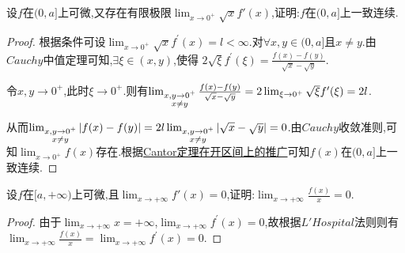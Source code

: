 \documentclass[lang=cn,newtx,10pt,scheme=chinese]{../Template/elegantbook}
\begin{document}
\begin{exercise}
    设\(f\)在\((0,a]\)上可微,又存在有限极限\(\lim_{x \to 0^+} \sqrt{x}f'(x)\),证明:\(f\)在\((0,a]\)上一致连续.
\end{exercise}
\begin{proof}
    根据条件可设\(\lim_{x\rightarrow 0^+} \sqrt{x}f^{\prime}(x)=l<\infty\).对\(\forall x,y\in (0,a]\)且\(x\neq y\).由\(Cauchy\)中值定理可知,\(\exists \xi \in (x,y)\),使得
\(2\sqrt{\xi}f^{\prime}(\xi)=\frac{f(x) - f(y)}{\sqrt{x}-\sqrt{y}}\).

令\(x,y\rightarrow 0^+ \),此时\(\xi \rightarrow 0^+\).则有\(\lim_{\begin{subarray}{c}
x,y\rightarrow 0^+\\
x\neq y
\end{subarray}} \frac{f(x) - f(y)}{\sqrt{x}-\sqrt{y}}=2\lim_{\xi \rightarrow 0^+} \sqrt{\xi}f^{\prime}(\xi)=2l\).

从而\(\lim_{\begin{subarray}{c}
x,y\rightarrow 0^+\\
x\neq y
\end{subarray}} \vert f(x) - f(y)\vert = 2l\lim_{\begin{subarray}{c}
x,y\rightarrow 0^+\\
x\neq y
\end{subarray}} \vert\sqrt{x}-\sqrt{y}\vert = 0\).由\(Cauchy\)收敛准则,可知\(\lim_{x\rightarrow 0^+} f(x)\)存在.根据\hyperref[pro:Cantor定理在开区间上的推广]{Cantor定理在开区间上的推广}可知\(f(x)\)在\((0,a]\)上一致连续.

\end{proof}

\begin{exercise}
    设\(f\)在\([a,+\infty)\)上可微,且\(\lim_{x \to +\infty} f'(x) = 0\),证明:\(\lim_{x \to +\infty} \frac{f(x)}{x} = 0\).
\end{exercise}
\begin{proof}
    由于\(\lim_{x\rightarrow +\infty}x = +\infty\),\(\lim_{x\rightarrow +\infty}f^{\prime}(x) = 0\),故根据\(L'Hospital\)法则则有\(\lim_{x\rightarrow +\infty}\frac{f(x)}{x}=\lim_{x\rightarrow +\infty}f^{\prime}(x) = 0\).

\end{proof}
\end{document}
